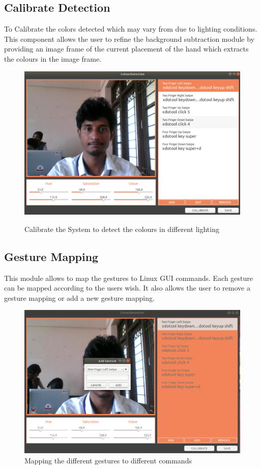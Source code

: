 \documentclass[11pt]{report}
\begin{document}
\subsection{Calibrate Detection}
    To Calibrate the colors detected which may vary from due to lighting conditions. This component allows
    the user to refine the background subtraction module by providing an image frame of the current placement of the hand which
    extracts the colours in the image frame.
    \begin{figure}[H]
    \includegraphics[width=14cm]{1.png}
    \label{Calibrate Detection}
    \caption{Calibrate the System to detect the colours in different lighting}
    \end{figure}
\subsection{Gesture Mapping}

    This module allows to map the gestures to Linux GUI commands. Each gesture can be mapped according to 
    the users wish. It also allows the user to remove a gesture mapping or add a new gesture mapping.
    \begin{figure}[H]
        \includegraphics[width=14cm]{2.png}
        \caption{Mapping the different gestures to different commands}

        \label{Map Gesture}
        \end{figure}
\end{document}
